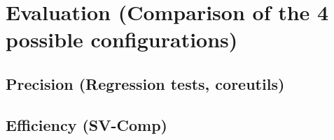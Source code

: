 \chapter{Evaluation (Comparison of the 4 possible configurations)}

\section{Precision (Regression tests, coreutils)}

\section{Efficiency (SV-Comp)}
